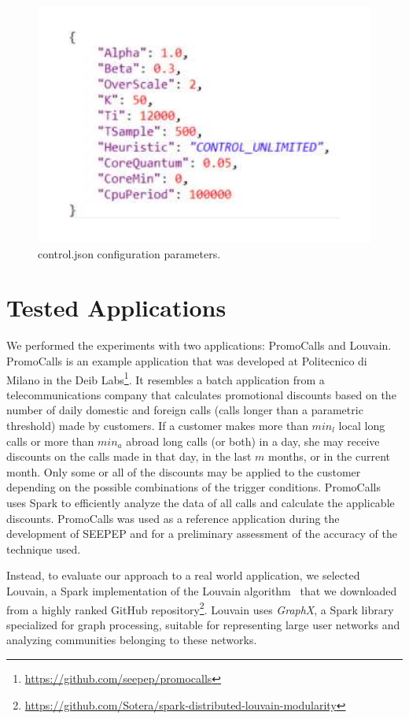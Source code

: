 \begin{figure}[thbp]
	\centering
	\includegraphics[width=\columnwidth]{images/xspark_control_unlimited_parms.pdf}
	\caption{control.json \cSpark configuration parameters.}
	\label{fig:xSparkConfigParms}
\end{figure}

\section{Tested Applications}\label{sec:tested_apps}
We performed the experiments with two applications: 
PromoCalls and Louvain. PromoCalls is an example application that was developed at Politecnico di Milano in the Deib Labs\footnote{\url{https://github.com/seepep/promocalls}}.
It resembles a batch application from a telecommunications company that calculates promotional discounts based on the number of daily domestic and foreign calls (calls longer than a parametric threshold) made by customers. 
If a customer makes more than  $min_l$ local long calls or more than $min_a$ abroad long calls (or both) in a day, she may receive discounts on the calls made in that day, in the last $m$ months, or in the current month. 
Only some or all of the discounts may be applied to the customer depending on the possible combinations of the trigger conditions. 
PromoCalls uses Spark to efficiently analyze the data of all calls and calculate the applicable discounts.
PromoCalls was used as a reference application during the development of SEEPEP and for a preliminary assessment of the accuracy of the technique used.

Instead, to evaluate our approach to a real world application, we selected Louvain, a Spark implementation of the Louvain algorithm~\cite{Louvain} that we downloaded from a highly ranked GitHub repository\footnote{\url{https://github.com/Sotera/spark-distributed-louvain-modularity}}. Louvain uses \textit{GraphX}, a Spark library specialized for graph processing, suitable for representing large user networks and analyzing communities belonging to these networks.


